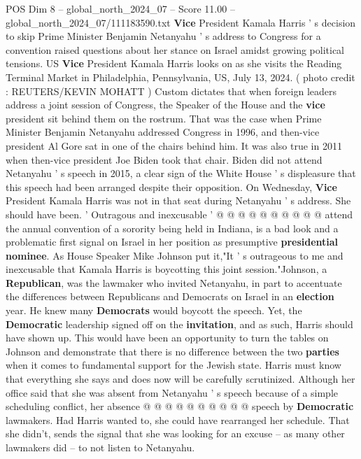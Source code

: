 \begin{textsample}{POS Dim 8 – global\_north\_2024\_07 – Score 11.00 – global\_north\_2024\_07/111183590.txt}  \label{ex:f8_pos_047}
\textbf{Vice} President Kamala Harris ' s decision to skip Prime Minister Benjamin Netanyahu ' s address to Congress for a convention raised questions about her stance on Israel amidst growing political tensions.
US \textbf{Vice} President Kamala Harris looks on as she visits the Reading Terminal Market in Philadelphia, Pennsylvania, US, July 13, 2024. ( photo credit : REUTERS/KEVIN MOHATT ) Custom dictates that when foreign leaders address a joint session of Congress, the Speaker of the House and the \textbf{vice} president sit behind them on the rostrum.
That was the case when Prime Minister Benjamin Netanyahu addressed Congress in 1996, and then-vice president Al Gore sat in one of the chairs behind him.
It was also true in 2011 when then-vice president Joe Biden took that chair.
Biden did not attend Netanyahu ' s speech in 2015, a clear sign of the White House ' s displeasure that this speech had been arranged despite their opposition.
On Wednesday, \textbf{Vice} President Kamala Harris was not in that seat during Netanyahu ' s address.
She should have been. ' Outragous and inexcusable ' @ @ @ @ @ @ @ @ @ @ attend the annual convention of a sorority being held in Indiana, is a bad look and a problematic first signal on Israel in her position as presumptive \textbf{presidential} \textbf{nominee}.
As House Speaker Mike Johnson put it,"It ' s outrageous to me and inexcusable that Kamala Harris is boycotting this joint session."Johnson, a \textbf{Republican}, was the lawmaker who invited Netanyahu, in part to accentuate the differences between Republicans and Democrats on Israel in an \textbf{election} year.
He knew many \textbf{Democrats} would boycott the speech.
Yet, the \textbf{Democratic} leadership signed off on the \textbf{invitation}, and as such, Harris should have shown up.
This would have been an opportunity to turn the tables on Johnson and demonstrate that there is no difference between the two \textbf{parties} when it comes to fundamental support for the Jewish state.
Harris must know that everything she says and does now will be carefully scrutinized.
Although her office said that she was absent from Netanyahu ' s speech because of a simple scheduling conflict, her absence @ @ @ @ @ @ @ @ @ @ speech by \textbf{Democratic} lawmakers.
Had Harris wanted to, she could have rearranged her schedule.
That she didn't, sends the signal that she was looking for an excuse -- as many other lawmakers did -- to not listen to Netanyahu.

\end{textsample}
